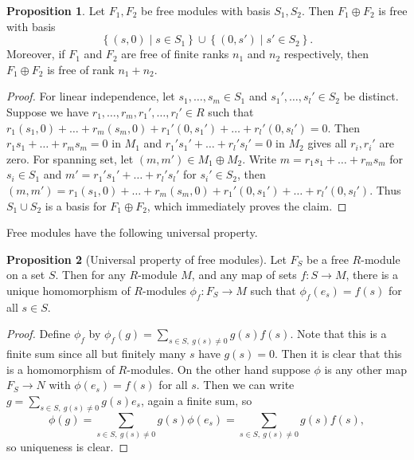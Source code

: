 \documentclass{article}
\newcommand{\rb}[1]{\left( #1 \right)}
\newcommand{\cb}[1]{\left\{ #1 \right\}}
\theoremstyle{definition}\newtheorem{definition}{Definition}[subsection]
\theoremstyle{definition}\newtheorem{remark}[definition]{Remark}
\theoremstyle{definition}\newtheorem*{example}{Example}
\theoremstyle{definition}\newtheorem*{note}{Note}
\newtheorem{proposition}[definition]{Proposition}
\begin{document}
\begin{proposition}
Let $ F_1, F_2 $ be free modules with basis $ S_1, S_2 $. Then $ F_1 \oplus F_2 $ is free with basis
$$ \cb{\rb{s, 0} \mid s \in S_1} \cup \cb{\rb{0, s'} \mid s' \in S_2}. $$ Moreover, if $ F_1 $ and $ F_2 $ are free of finite ranks $ n_1 $ and $ n_2 $ respectively, then $ F_1 \oplus F_2 $ is free of rank $ n_1 + n_2 $.
\end{proposition}

\begin{proof}
For linear independence, let $ s_1, \dots, s_m \in S_1 $ and $ s_1', \dots, s_l' \in S_2 $ be distinct. Suppose we have $ r_1, \dots, r_m, r_1', \dots, r_l' \in R $ such that $ r_1\rb{s_1, 0} + \dots + r_m\rb{s_m, 0} + r_1'\rb{0, s_1'} + \dots + r_l'\rb{0, s_l'} = 0 $. Then $ r_1s_1 + \dots + r_ms_m = 0 $ in $ M_1 $ and $ r_1's_1' + \dots + r_l's_l' = 0 $ in $ M_2 $ gives all $ r_i, r_i' $ are zero. For spanning set, let $ \rb{m, m'} \in M_1 \oplus M_2 $. Write $ m = r_1s_1 + \dots + r_ms_m $ for $ s_i \in S_1 $ and $ m' = r_1's_1' + \dots + r_l's_l' $ for $ s_i' \in S_2 $, then $ \rb{m, m'} = r_1\rb{s_1, 0} + \dots + r_m\rb{s_m, 0} + r_1'\rb{0, s_1'} + \dots + r_l'\rb{0, s_l'} $. Thus $ S_1 \cup S_2 $ is a basis for $ F_1 \oplus F_2 $, which immediately proves the claim.
\end{proof}

Free modules have the following universal property.

\begin{proposition}[Universal property of free modules]
Let $ F_S $ be a free $ R $-module on a set $ S $. Then for any $ R $-module $ M $, and any map of sets $ f : S \to M $, there is a unique homomorphism of $ R $-modules $ \phi_f : F_S \to M $ such that $ \phi_f\rb{e_s} = f\rb{s} $ for all $ s \in S $.
\end{proposition}

\begin{proof}
Define $ \phi_f $ by $ \phi_f\rb{g} = \sum_{s \in S, \ g\rb{s} \ne 0} g\rb{s}f\rb{s} $. Note that this is a finite sum since all but finitely many $ s $ have $ g\rb{s} = 0 $. Then it is clear that this is a homomorphism of $ R $-modules. On the other hand suppose $ \phi $ is any other map $ F_S \to N $ with $ \phi\rb{e_s} = f\rb{s} $ for all $ s $. Then we can write $ g = \sum_{s \in S, \ g\rb{s} \ne 0} g\rb{s}e_s $, again a finite sum, so
$$ \phi\rb{g} = \sum_{s \in S, \ g\rb{s} \ne 0} g\rb{s}\phi\rb{e_s} = \sum_{s \in S, \ g\rb{s} \ne 0} g\rb{s}f\rb{s}, $$
so uniqueness is clear.
\end{proof}
\end{document}

